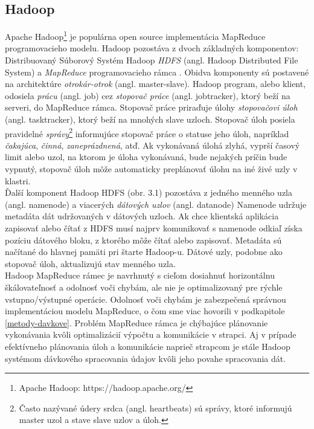 \subsection{Hadoop} 
\label{hadoop-exists}
Apache Hadoop\footnote{Apache Hadoop: https://hadoop.apache.org/} je populárna open source 
implementácia MapReduce programovacieho modelu. Hadoop pozostáva z dvoch základných komponentov: Distribuovaný Súborový Systém Hadoop \textit{HDFS} (angl. Hadoop Distributed File System) a \textit{MapReduce} programovacieho rámca \citep{liu2014survey}. Obidva komponenty sú postavené na architektúre \textit{otrokár-otrok} (angl. master-slave). Hadoop program, alebo klient, odosiela \textit{prácu} (angl. job) cez \textit{stopovač práce} (angl. jobtracker), ktorý beží na serveri, do MapReduce rámca. Stopovač práce priraďuje úlohy \textit{stopovačovi úloh} (angl. tasktracker), ktorý beží na mnohých slave uzloch. Stopovač úloh posiela pravidelné \textit{správy}\footnote{Často nazývané údery srdca (angl. heartbeats) sú správy, ktoré informujú master uzol a stave slave uzlov a úloh.} informujúce stopovač práce o statuse jeho úloh, napríklad \textit{čakajúca}, \textit{činná}, \textit{zaneprázdnená}, atď. Ak vykonávaná úlohá zlyhá, vyprší časový limit alebo uzol, na ktorom je úloha vykonávaná, bude nejakých príčin bude vypnutý, stopovač úloh môže automaticky preplánovať úlohu na iné živé uzly v klastri. 
  \\[5pt]
 Ďalší komponent Hadoop HDFS (obr. 3.1) pozostáva z jedného menného uzla (angl. namenode) a viacerých \textit{dátových uzlov} (angl. datanode) Namenode udržuje metadáta dát udržovaných v dátových uzloch. Ak chce klientská aplikácia zapisovať alebo čítať z HDFS musí najprv komunikovať s namenode odkiaľ získa pozíciu dátového bloku, z ktorého môže čítať alebo zapisovať. Metadáta sú načítané do hlavnej pamäti pri štarte Hadoop-u. Dátové uzly, podobne ako stopovač úloh, aktualizujú stav menného uzla. 
 \\[1pt]
 Hadoop MapReduce rámec je navrhnutý s cieľom dosiahnuť horizontálnu škálovateľnosť a odolnosť voči chybám, ale nie je optimalizovaný pre rýchle vstupno/výstupné operácie. Odolnosť voči chybám je zabezpečená správnou implementáciou modelu MapReduce, o čom sme viac hovorili v podkapitole \ref{metody-davkove}. Problém MapReduce rámca je chýbajúce plánovanie vykonávania kvôli optimalizácií výpočtu a komunikácie v strapci. Aj v prípade efektívneho plánovania úloh a komunikácie naprieč strapcom je stále Hadoop systémom dávkového spracovania údajov kvôli jeho povahe spracovania dát.
 
